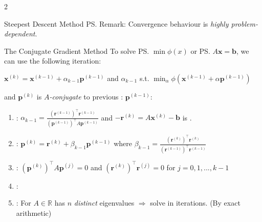 \documentclass{note}
\begin{document}
\begin{multicols}{2}
{{\begin{MyTh}{Steepest Descent Method}
        \quad \ps{Remark}: Convergence behaviour is \textit{highly problem-dependent}. 
    \end{MyTh}

    \begin{MyTh}{The Conjugate Gradient Method} \tiny
        To solve \ps{$\min \phi(x)$} or \ps{$A\mathbf{x}=\mathbf{b}$}, we can use the following iteration:

        \quad $\mathbf{x}^{(k)}=\mathbf{x}^{(k-1)}+\alpha_{k-1} \mathbf{p}^{(k-1)}$ \quad and \quad $\alpha_{k-1}$ s.t. $\min_{\alpha} \phi(\mathbf{x}^{(k-1)} + \alpha \mathbf{p}^{(k-1)})$ 
        
        \quad and $\mathbf{p}^{(k)}$ is \textit{$A$-conjugate} to previous : $\mathbf{p}^{(k-1)}$: 

        \vspace{-2pt}
        \begin{enumerate}
            \item {}: $\alpha_{k-1} = \frac{(\mathbf{r}^{(k-1)})^{\top}\mathbf{r}^{(k-1)}}{(\mathbf{p}^{(k-1)})^{\top}A\mathbf{p}^{(k-1)}}$ \quad and \quad $-\mathbf{r}^{(k)} = A\mathbf{x}^{(k)}-\mathbf{b}$ is .
            \vspace{-3pt}
            \item {}: $\mathbf{p}^{(k)} = \mathbf{r}^{(k)} + \beta_{k-1} \mathbf{p}^{(k-1)}$ \quad where $\beta_{k-1} = \frac{(\mathbf{r}^{(k)})^{\top}\mathbf{r}^{(k)}}{(\mathbf{r}^{(k-1)})^{\top}\mathbf{r}^{(k-1)}}$
            \vspace{-2pt}
            \item {}: $(\mathbf{p}^{(k)})^{\top}A\mathbf{p}^{(j)}=0$ \quad and \quad $(\mathbf{r}^{(k)})^{\top}\mathbf{r}^{(j)}=0$ \quad for $j=0,1,...,k-1$
            \item {}: 

            \vspace{-3pt}
             \qquad \qquad \qquad {}
            \vspace{-3pt}
            \item {}: For $A\in\mathbb{R}$ has $n$ \textit{distinct} eigenvalues $\Rightarrow$ solve in  iterations. (By exact arithmetic)
        \end{enumerate}
    \end{MyTh}

}}
\end{multicols}
\end{document}
